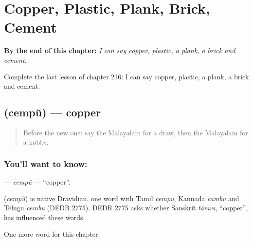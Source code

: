 
\chapter{Copper, Plastic, Plank, Brick, Cement}
\label{ch:ml-copper-plastic-plank-brick-cement}

\begin{chapteropening}
\textbf{By the end of this chapter:} \emph{I can say copper, plastic, a plank, a brick and cement.}

Complete the last lesson of chapter 216: I can say copper, plastic, a plank, a brick and cement.
\end{chapteropening}

\section[\texorpdfstring{\ml{ചെമ്പ്} (cempŭ)}{ചെമ്പ് (cempŭ)}]{ (cempŭ) — copper}

\label{lesson:ML-C216-cempu}



\begin{quote}
Before the new one: say the Malayalam for a draw, then the Malayalam for a hobby.
\end{quote}

\subsection*{You'll want to know: }
\textbf{} — \emph{cempŭ} — \textquotedblleft{}copper\textquotedblright{}.

\begin{cousinweb}
\textbf{} (\emph{cempŭ}) is native Dravidian, one word with Tamil \emph{cempu}, Kannada \emph{cambu} and Telugu \emph{cembu} (DEDR 2775). DEDR 2775 asks whether Sanskrit \emph{tāmra}, \textquotedblleft{}copper\textquotedblright{}, has influenced these words.
\end{cousinweb}

\begin{grammarlens}[title={What you've built}]
One more word for this chapter.
\end{grammarlens}

